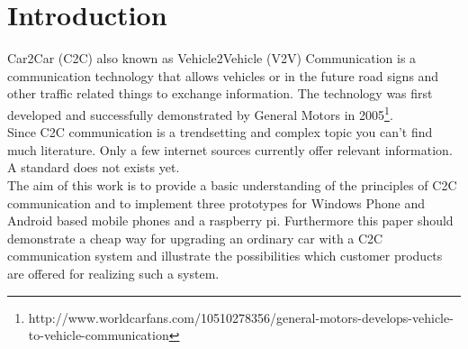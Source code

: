 \chapter{Introduction}
\label{cha:Introduction}
Car2Car (C2C) also known as Vehicle2Vehicle (V2V) Communication is a communication technology that allows vehicles or in the future road signs and other traffic related things to exchange information. The technology was first developed and successfully demonstrated by General Motors in 2005\footnote{http://www.worldcarfans.com/10510278356/general-motors-develops-vehicle-to-vehicle-communication}.
\\
Since C2C communication is a trendsetting and complex topic you can't find much literature. Only a few internet sources currently offer relevant information. A standard does not exists yet.\\
The aim of this work is to provide a basic understanding of the principles of C2C communication and to implement three prototypes for Windows Phone and Android based mobile phones and a raspberry pi. Furthermore this paper should demonstrate a cheap way for upgrading an ordinary car with a C2C communication system and illustrate the possibilities which customer products are offered for realizing such a system.
